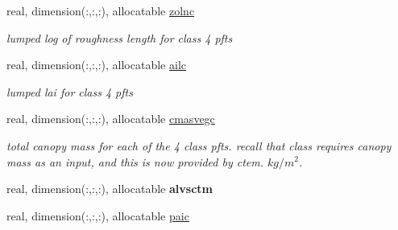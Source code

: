 \begin{DoxyCompactItemize}
\item 
\hypertarget{structctem__statevars_1_1veg__rot_a429181968be41375bc24fa3a467e40d8}{}real, dimension(\+:,\+:,\+:), allocatable \hyperlink{structctem__statevars_1_1veg__rot_a429181968be41375bc24fa3a467e40d8}{zolnc}\label{structctem__statevars_1_1veg__rot_a429181968be41375bc24fa3a467e40d8}

\begin{DoxyCompactList}\small\item\em lumped log of roughness length for class\textquotesingle{} 4 pfts \end{DoxyCompactList}\item 
\hypertarget{structctem__statevars_1_1veg__rot_a201e5ae44b76599308ed91485e9daa59}{}real, dimension(\+:,\+:,\+:), allocatable \hyperlink{structctem__statevars_1_1veg__rot_a201e5ae44b76599308ed91485e9daa59}{ailc}\label{structctem__statevars_1_1veg__rot_a201e5ae44b76599308ed91485e9daa59}

\begin{DoxyCompactList}\small\item\em lumped lai for class\textquotesingle{} 4 pfts \end{DoxyCompactList}\item 
\hypertarget{structctem__statevars_1_1veg__rot_aac98594f6b9caf07b57c6c771e18781c}{}real, dimension(\+:,\+:,\+:), allocatable \hyperlink{structctem__statevars_1_1veg__rot_aac98594f6b9caf07b57c6c771e18781c}{cmasvegc}\label{structctem__statevars_1_1veg__rot_aac98594f6b9caf07b57c6c771e18781c}

\begin{DoxyCompactList}\small\item\em total canopy mass for each of the 4 class pfts. recall that class requires canopy mass as an input, and this is now provided by ctem. $kg/m^2$. \end{DoxyCompactList}\item 
\hypertarget{structctem__statevars_1_1veg__rot_a43ed2e318327dc94ecc025ca8a5121af}{}real, dimension(\+:,\+:,\+:), allocatable {\bfseries alvsctm}\label{structctem__statevars_1_1veg__rot_a43ed2e318327dc94ecc025ca8a5121af}

\item 
\hypertarget{structctem__statevars_1_1veg__rot_a3ada189b3e0dbf4943ce3eda9358be10}{}real, dimension(\+:,\+:,\+:), allocatable \hyperlink{structctem__statevars_1_1veg__rot_a3ada189b3e0dbf4943ce3eda9358be10}{paic}\label{structctem__statevars_1_1veg__rot_a3ada189b3e0dbf4943ce3eda9358be10}


\end{DoxyCompactItemize}
